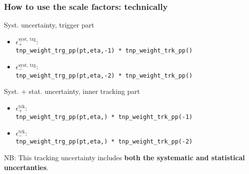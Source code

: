 \documentclass[9pt]{beamer}
\begin{document}
 \begin{frame}[plain]
  \frametitle{How to use the scale factors: technically}
  
  \begin{block}{Syst. uncertainty, trigger part}
  \begin{itemize}
   \item \alert{$\epsilon^\text{syst, trg}_{+}$}: \\\texttt{tnp\_weight\_trg\_pp(pt,eta,\alert{-1}) * tnp\_weight\_trk\_pp()}
   
   \item \alert{$\epsilon^\text{syst, trg}_{-}$}: \\\texttt{tnp\_weight\_trg\_pp(pt,eta,\alert{-2}) * tnp\_weight\_trk\_pp()}
   \end{itemize}
  \end{block}
  
    \begin{block}{Syst. + stat. uncertainty, inner tracking part}
  \begin{itemize}
   \item \alert{$\epsilon^\text{trk}_{+}$}: \\\texttt{tnp\_weight\_trg\_pp(pt,eta,) * tnp\_weight\_trk\_pp(\alert{-1})}
   
   \item \alert{$\epsilon^\text{trk}_{-}$}: \\\texttt{tnp\_weight\_trg\_pp(pt,eta,) * tnp\_weight\_trk\_pp(\alert{-2})}
   \end{itemize}
   
   \footnotesize \alert{NB}: This tracking uncertainty includes \textbf{both the systematic and statistical uncertanties}.
  \end{block}
  

 \end{frame}
\end{document}
